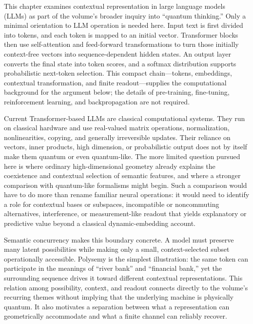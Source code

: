 \documentclass[
  aps,
  reprint,
  superscriptaddress,
  floatfix,
  nofootinbib,
  longbibliography
]{revtex4-2}
\begin{document}
This chapter examines contextual representation in large language models
(LLMs) as part of the volume's broader inquiry into ``quantum thinking.''
Only a minimal orientation to LLM operation is needed here.  Input text is
first divided into tokens, and each token is mapped to an initial vector.
Transformer blocks then use self-attention and feed-forward transformations
to turn those initially context-free vectors into sequence-dependent hidden
states.  An output layer converts the final state into token scores, and a
softmax distribution supports probabilistic next-token selection.  This
compact chain---tokens, embeddings, contextual transformation, and finite
readout---supplies the computational background for the argument below; the
details of pre-training, fine-tuning, reinforcement learning, and
backpropagation are not required.

Current Transformer-based LLMs are classical computational systems.  They
run on classical hardware and use real-valued matrix operations,
normalization, nonlinearities, copying, and generally irreversible updates.
Their reliance on vectors, inner products, high dimension, or probabilistic
output does not by itself make them quantum or even quantum-like.  The more
limited question pursued here is where ordinary high-dimensional geometry
already explains the coexistence and contextual selection of semantic
features, and where a stronger comparison with quantum-like formalisms might
begin.  Such a comparison would have to do more than rename familiar neural
operations: it would need to identify a role for contextual bases or subspaces,
incompatible or noncommuting alternatives, interference, or
measurement-like readout that yields explanatory or predictive value beyond
a classical dynamic-embedding account.

Semantic concurrency makes this boundary concrete.  A model must preserve
many latent possibilities while making only a small, context-selected subset
operationally accessible.  Polysemy is the simplest illustration: the same
token can participate in the meanings of ``river bank'' and ``financial
bank,'' yet the surrounding sequence drives it toward different contextual
representations.  This relation among possibility, context, and readout
connects directly to the volume's recurring themes without implying that the
underlying machine is physically quantum.  It also motivates a separation
between what a representation can geometrically accommodate and what a
finite channel can reliably recover.
\end{document}
